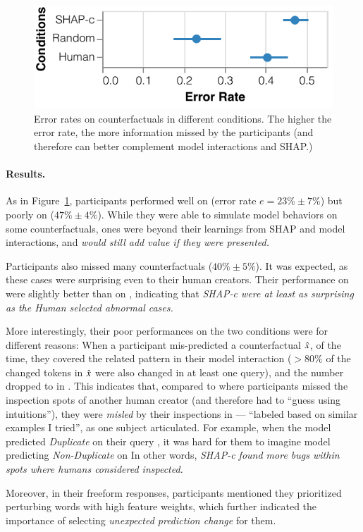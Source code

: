 \begin{figure}[t]
\centering
\includegraphics[width=1\columnwidth]{figures/exp_err_rate}
\vspace{-15pt}
\caption{
Error rates on counterfactuals in different conditions. The higher the error rate, the more information missed by the participants (\ie and therefore can better complement model interactions and SHAP.)
}
\vspace{-10pt}
\label{fig:err_rate}
\end{figure}

\paragraph{Results.}
As in Figure~\ref{fig:err_rate}, participants performed well on \crandom (error rate $e=23\%\pm7\%$) but poorly on \cshap ($47\%\pm 4\%$).
While they were able to simulate model behaviors on some counterfactuals, \cshap ones were beyond their learnings from SHAP and model interactions, and \emph{would still add value if they were presented.}

Participants also missed many \chuman counterfactuals ($40\%\pm 5\%$).
It was expected, as these cases were surprising even to their human creators.
Their performance on \chuman were slightly better than on \cshap, indicating that \emph{SHAP-c were at least as surprising as the Human selected abnormal cases.}

More interestingly, their poor performances on the two conditions were for different reasons: 
When a participant mis-predicted a \cshap counterfactual $\hat{x}$,  of the time, they covered the related pattern in their model interaction (\ie $>80\%$ of the changed tokens in $\hat{x}$ were also changed in at least one query), and the number dropped to  in \chuman.
This indicates that, compared to \chuman where participants missed the inspection spots of another human creator (and therefore had to ``guess using intuitions''), they were \emph{misled} by their inspections in \cshap --- ``labeled based on similar examples I tried'', as one subject articulated.
For example, when the model predicted \emph{Duplicate} on their query , it was hard for them to imagine model predicting \emph{Non-Duplicate} on  
In other words, \emph{SHAP-c found more bugs within spots where humans considered inspected.}

Moreover, in their freeform responses,  participants mentioned they prioritized perturbing words with high feature weights, which further indicated the importance of selecting \emph{unexpected prediction change} for them.


